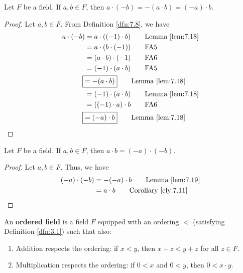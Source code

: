 \documentclass[../main.tex]{subfiles}
\begin{document}
\begin{lemma}\label{lem:7.19}
    Let $F$ be a field. If $a,b\in F$, then $a\cdot(-b)=-(a\cdot b)=(-a)\cdot b$.
    \begin{proof}
        Let $a,b\in F$. From Definition \ref{dfn:7.8}, we have
        \begin{align*}
            a\cdot(-b) &= a\cdot((-1)\cdot b)\tag*{Lemma \ref{lem:7.18}}\\
            &= a\cdot(b\cdot(-1))\tag*{FA5}\\
            &= (a\cdot b)\cdot(-1)\tag*{FA6}\\
            &= (-1)\cdot(a\cdot b)\tag*{FA5}\\
            \Aboxed{&= -(a\cdot b)}\tag*{Lemma \ref{lem:7.18}}\\
            &= (-1)\cdot(a\cdot b)\tag*{Lemma \ref{lem:7.18}}\\
            &= ((-1)\cdot a)\cdot b\tag*{FA6}\\
            \Aboxed{&= (-a)\cdot b}\tag*{Lemma \ref{lem:7.18}}
        \end{align*}
    \end{proof}
\end{lemma}

\begin{lemma}\label{lem:7.20}
    Let $F$ be a field. If $a,b\in F$, then $a\cdot b=(-a)\cdot(-b)$.
    \begin{proof}
        Let $a,b\in F$. Thus, we have
        \begin{align*}
            (-a)\cdot(-b) &= -(-a)\cdot b\tag*{Lemma \ref{lem:7.19}}\\
            &= a\cdot b\tag*{Corollary \ref{cly:7.11}}
        \end{align*}
    \end{proof}
\end{lemma}

\begin{definition}\label{dfn:7.21}
    An \textbf{ordered field} is a field $F$ equipped with an ordering $<$ (satisfying Definition \ref{dfn:3.1}) such that also:
    \begin{enumerate}[label={(\alph*)},ref={\thedefinition\alph*}]
        \item \label{dfn:7.21a}Addition respects the ordering: if $x<y$, then $x+z<y+z$ for all $z\in F$.
        \item \label{dfn:7.21b}Multiplication respects the ordering: if $0<x$ and $0<y$, then $0<x\cdot y$.
    \end{enumerate}
\end{definition}
\end{document}
